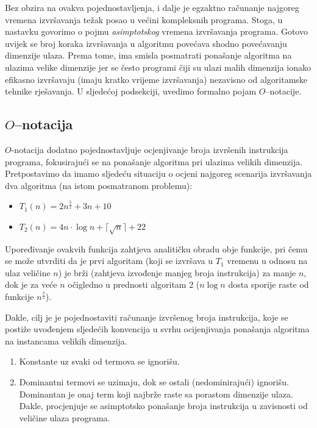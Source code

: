 Bez obzira na ovakva pojednostavljenja, i dalje je egzaktno računanje najgoreg vremena izvršavanja težak posao u većini kompleksnih programa. Stoga, u nastavku govorimo o pojmu \textit{asimptotskog} vremena izvršavanja programa.  Gotovo uvijek se broj koraka izvršavanja u algoritmu povećava shodno povećavanju dimenzije ulaza. Prema tome, ima smisla posmatrati ponašanje algoritma na  
ulazima velike dimenzije jer se često programi čiji su ulazi  malih dimenzija ionako efikasno izvršavaju (imaju kratko vrijeme izvršavanja)  nezavisno od algoritamske tehnike rješavanja. U sljedećoj podsekciji, uvedimo formalno pojam $O$--notacije. 
 
 
\subsection{$O$--notacija} 
$O$-notacija   dodatno pojednostavljuje ocjenjivanje broja izvršenih instrukcija  programa, fokusirajući se na ponašanje algoritma pri ulazima velikih dimenzija.  Pretpostavimo da imamo sljedeću situaciju o ocjeni najgoreg scenarija izvršavanja dva algoritma (na istom posmatranom problemu): 
\begin{itemize}
	\item $T_1(n) = 2 n^{\frac{3}{2}} + 3n + 10$
	\item $T_2(n) = 4 n \cdot \log n + \lceil \sqrt{n} \rceil + 22 $
\end{itemize}

Upoređivanje ovakvih funkcija zahtjeva analitičku obradu obje funkcije, pri čemu se može utvrditi da je prvi algoritam (koji se izvršava u $T_1$ vremenu u odnosu na ulaz veličine $n$) je brži (zahtjeva izvođenje manjeg broja instrukcija) za manje $n$, dok je za veće $n$ očigledno u prednosti algoritam 2 ($n \log n$ dosta sporije raste od funkcije $n^{\frac{3}{2}}$). 

Dakle, cilj je je pojednostaviti računanje izvršenog broja instrukcija, koje se postiže uvođenjem sljedećih konvencija u svrhu ocijenjivanja ponašanja algoritma na instancama velikih dimenzija.
\begin{enumerate}
	\item Konstante uz svaki od termova se ignorišu.
	\item Dominantni termovi se uzimaju, dok se ostali (nedominirajući) ignorišu. Dominantan je onaj term koji najbrže raste sa porastom dimenzije ulaza. Dakle, procjenjuje se asimptotsko ponašanje broja instrukcija u zavisnosti od veličine ulaza programa. 
\end{enumerate}

